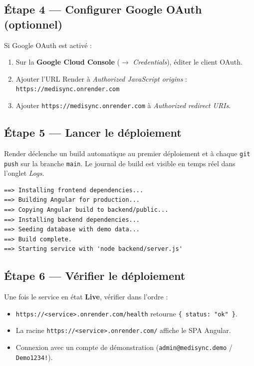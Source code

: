\documentclass[12pt,a4paper]{report}
\begin{document}
\subsection{Étape 4 — Configurer Google OAuth (optionnel)}

Si Google OAuth est activé :

\begin{enumerate}[leftmargin=*,itemsep=2pt]
  \item Sur la \textbf{Google Cloud Console} ($\rightarrow$ \textit{Credentials}), éditer le client OAuth.
  \item Ajouter l'URL Render à \textit{Authorized JavaScript origins} : \texttt{https://medisync.onrender.com}
  \item Ajouter \texttt{https://medisync.onrender.com} à \textit{Authorized redirect URIs}.
\end{enumerate}

\subsection{Étape 5 — Lancer le déploiement}

Render déclenche un build automatique au premier déploiement et à chaque \texttt{git push} sur la branche \texttt{main}. Le journal de build est visible en temps réel dans l'onglet \textit{Logs}.

\begin{lstlisting}[style=bash]
==> Installing frontend dependencies...
==> Building Angular for production...
==> Copying Angular build to backend/public...
==> Installing backend dependencies...
==> Seeding database with demo data...
==> Build complete.
==> Starting service with 'node backend/server.js'
\end{lstlisting}

\subsection{Étape 6 — Vérifier le déploiement}

Une fois le service en état \textbf{Live}, vérifier dans l'ordre :

\begin{itemize}[leftmargin=*,itemsep=2pt]
  \item \texttt{https://<service>.onrender.com/health} retourne \texttt{\{ status: "ok" \}}.
  \item La racine \texttt{https://<service>.onrender.com/} affiche le SPA Angular.
  \item Connexion avec un compte de démonstration (\texttt{admin@medisync.demo} / \texttt{Demo1234!}).
\end{itemize}
\end{document}
